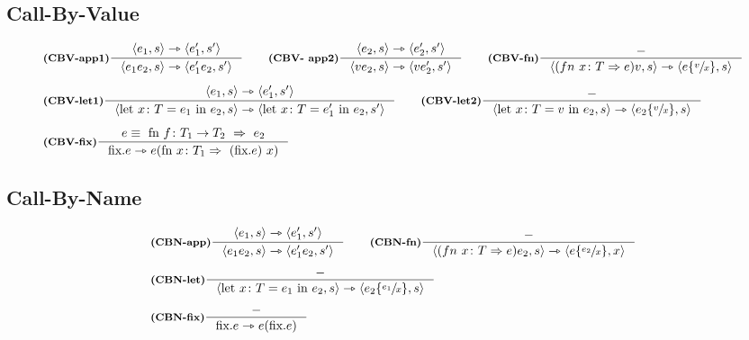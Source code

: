 \documentclass[a4paper, 10pt]{article}
\theoremstyle{definition}
\newcommand{\infer}[4]{\inference[\textbf{#1}]{#2}{#3}#4 }
\newcommand{\srule}[2]{\langle #1 \rangle \rightarrowtriangle \langle #2 \rangle}
\newcommand{\srulea}[2]{ #1  \rightarrowtriangle #2}
\newcommand{\letin}[2]{\text{let } #1 \text{ in } #2}
\newcommand{\subs}[3]{#1 \lbrace \sfrac{#2}{#3} \rbrace}
\begin{document}
\begin{minipage}{.45\linewidth}
\begin{flushleft}
\subsection*{Call-By-Value}
	\begin{align*}
		&\infer{(CBV-app1)}{\srule{e_1, s}{e_1', s'}}{\srule{e_1 e_2, s}{e_1'e_2, s'}}{} \qquad
		\infer{(CBV- app2)}{\srule{e_2, s}{e_2', s'}}{\srule{ve_2, s}{ve_2', s'}}{} \qquad
		\infer{(CBV-fn)}{-}{\srule{(fn\ x\colon T\Rightarrow e)v, s}{\subs{e}{v}{x}, s}}{} \\ \\
		&\infer{(CBV-let1)}{\srule{e_1,s}{e_1', s'}}{\srule{\letin{x\colon T = e_1}{e_2, s}}{\letin{x\colon T = e_1'}{e_2, s'}}}{} \qquad
		\infer{(CBV-let2)}{-}{\srule{\letin{x\colon T = v}{e_2, s}}{\subs{e_2}{v}{x}, s}}{} \\ \\
		&\infer{(CBV-fix)}{e\equiv\ \text{fn } f\colon T_1 \rightarrow T_2\ \Rightarrow\ e_2}{\srulea{\text{fix}.e}{e(\text{fn }x\colon T_1 \Rightarrow\ (\text{fix}.e)\ x)}}{}
	\end{align*}
\subsection*{Call-By-Name}
	\begin{align*}
		&\infer{(CBN-app)}{\srule{e_1, s}{e_1', s'}}{\srule{e_1e_2, s}{e_1'e_2, s'}}{} \qquad
		\infer{(CBN-fn)}{-}{\srule{(fn\ x\colon T\Rightarrow e)e_2, s}{\subs{e}{e_2}{x},x}}{} \\ \\
		&\infer{(CBN-let)}{-}{\srule{\letin{x\colon T = e_1}{e_2, s}}{\subs{e_2}{e_1}{x}, s}}{} \\ \\
		&\infer{(CBN-fix)}{-}{\srulea{\text{fix}.e}{e(\text{fix}.e)}}{}
	\end{align*}
	\end{flushleft}
\end{minipage}
	\newpage
	
\end{document}
